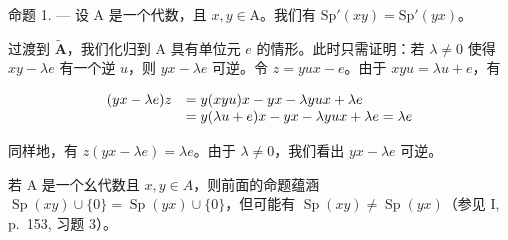 命题 1. --- 设 A 是一个代数，且 \(x, y \in \mathrm{A}\)。我们有 \(\mathrm{Sp}'(xy) = \mathrm{Sp}'(yx)\)。

过渡到 \(\widetilde{\mathbf{A}}\)，我们化归到 A 具有单位元 \(e\) 的情形。此时只需证明：若 \(\lambda \neq 0\) 使得 \(xy - \lambda e\) 有一个逆 \(u\)，则 \(yx - \lambda e\) 可逆。令 \(z = yux - e\)。由于 \(xyu = \lambda u + e\)，有

\[
\begin{array}{r l} (y x - \lambda e) z & = y (x y u) x - y x - \lambda y u x + \lambda e \\ & = y (\lambda u + e) x - y x - \lambda y u x + \lambda e = \lambda e \end{array}
\]

同样地，有 \(z(yx - \lambda e) = \lambda e\)。由于 \(\lambda \neq 0\)，我们看出 \(yx - \lambda e\) 可逆。

若 A 是一个幺代数且 \(x, y \in A\)，则前面的命题蕴涵 \(\operatorname{Sp}(xy) \cup \{0\} = \operatorname{Sp}(yx) \cup \{0\}\)，但可能有 \(\operatorname{Sp}(xy) \neq \operatorname{Sp}(yx)\)（参见 I, p.~153, 习题 3）。

